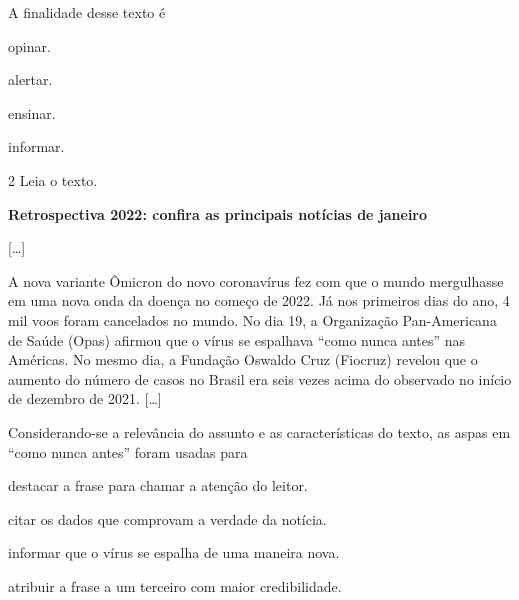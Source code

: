 A finalidade desse texto é

\begin{escolha}
\item opinar.

\item alertar.

\item ensinar.

\item informar.
\end{escolha}

\pagebreak

\num{2} Leia o texto.

\begin{myquote}
\textbf{Retrospectiva 2022: confira as principais notícias de janeiro}

{[}\ldots{]}

A nova variante Ômicron do novo coronavírus fez com que o mundo
mergulhasse em uma nova onda da doença no começo de 2022. Já nos
primeiros dias do ano, 4 mil voos foram cancelados no mundo. No dia 19,
a Organização Pan-Americana de Saúde (Opas) afirmou que o vírus se
espalhava ``como nunca antes'' nas Américas. No mesmo dia, a Fundação
Oswaldo Cruz (Fiocruz) revelou que o aumento do número de casos no
Brasil era seis vezes acima do observado no início de dezembro de 2021.
{[}\ldots{]}

\end{myquote}

Considerando-se a relevância do assunto e as características do texto,
as aspas em ``como nunca antes'' foram usadas para

\begin{escolha}

\item destacar a frase para chamar a atenção do leitor. 
\item citar os dados que comprovam a verdade da notícia.
\item informar que o vírus se espalha de uma maneira nova.
\item atribuir a frase a um terceiro com maior credibilidade.
\end{escolha}

